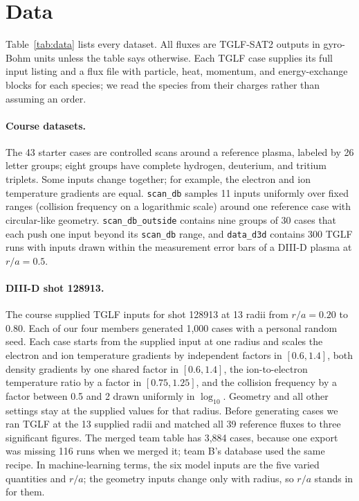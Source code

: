 \documentclass[12pt,letterpaper]{article}
\begin{document}
\section{Data}
\label{sec:data}

Table~\ref{tab:data} lists every dataset. All fluxes are TGLF-SAT2 outputs in gyro-Bohm
units unless the table says otherwise. Each TGLF case supplies its full input listing and a
flux file with particle, heat, momentum, and energy-exchange blocks for each species; we
read the species from their charges rather than assuming an order.

\paragraph{Course datasets.} The 43 starter cases are controlled scans around a reference
plasma, labeled by 26 letter groups; eight groups have complete hydrogen, deuterium, and
tritium triplets. Some inputs change together; for example, the electron and ion
temperature gradients are equal. \texttt{scan\_db} samples 11 inputs uniformly over fixed
ranges (collision frequency on a logarithmic scale) around one reference case with
circular-like geometry. \texttt{scan\_db\_outside} contains nine groups of 30 cases that
each push one input beyond its \texttt{scan\_db} range, and \texttt{data\_d3d} contains 300
TGLF runs with inputs drawn within the measurement error bars of a DIII-D plasma at
$r/a=0.5$.

\paragraph{DIII-D shot 128913.} The course supplied TGLF inputs for shot 128913 at 13
radii from $r/a=0.20$ to $0.80$. Each of our four members generated 1,000 cases with a
personal random seed. Each case starts from the supplied input at one radius and scales the
electron and ion temperature gradients by independent factors in $[0.6,1.4]$, both density
gradients by one shared factor in $[0.6,1.4]$, the ion-to-electron temperature ratio by a
factor in $[0.75,1.25]$, and the collision frequency by a factor between 0.5 and 2 drawn
uniformly in $\log_{10}$. Geometry and all other settings stay at the supplied values for
that radius. Before generating cases we ran TGLF at the 13 supplied radii and matched all
39 reference fluxes to three significant figures. The merged team table has 3,884 cases,
because one export was missing 116 runs when we merged it; team B's database used the same
recipe. In machine-learning terms, the six model inputs are the five varied quantities and
$r/a$; the geometry inputs change only with radius, so $r/a$ stands in for them.
\end{document}
